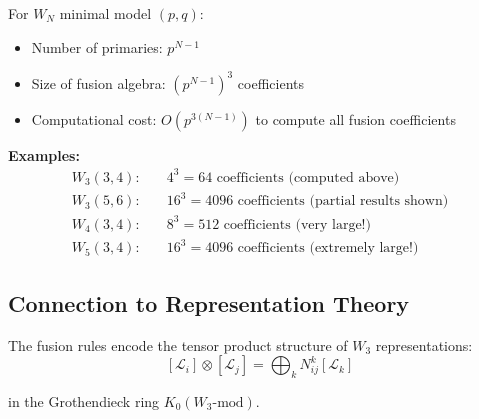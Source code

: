 \begin{remark}\label{rem:wn-complexity}
For $W_N$ minimal model $(p,q)$:
\begin{itemize}
\item Number of primaries: $p^{N-1}$
\item Size of fusion algebra: $(p^{N-1})^3$ coefficients
\item Computational cost: $O(p^{3(N-1)})$ to compute all fusion coefficients
\end{itemize}

\textbf{Examples:}
\begin{align}
W_3(3,4): \quad & 4^3 = 64 \text{ coefficients (computed above)} \\
W_3(5,6): \quad & 16^3 = 4096 \text{ coefficients (partial results shown)} \\
W_4(3,4): \quad & 8^3 = 512 \text{ coefficients (very large!)} \\
W_5(3,4): \quad & 16^3 = 4096 \text{ coefficients (extremely large!)}
\end{align}
\end{remark}

\subsection{Connection to Representation Theory}

The fusion rules encode the tensor product structure of $W_3$ representations:
$$[\mathcal{L}_i] \otimes [\mathcal{L}_j] = \bigoplus_k N_{ij}^k [\mathcal{L}_k]$$

in the Grothendieck ring $K_0(W_3\text{-mod})$.

